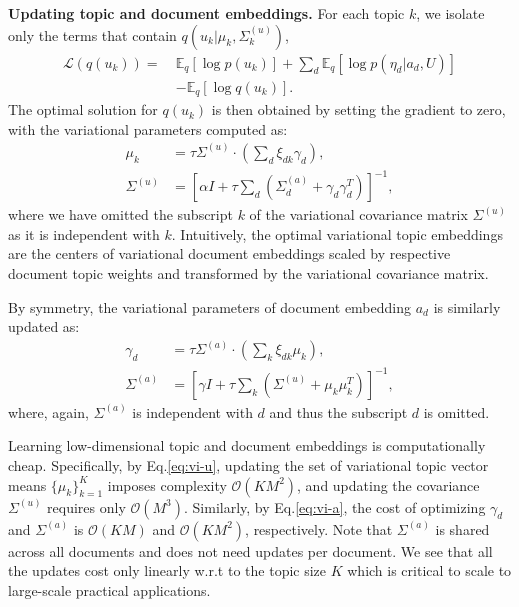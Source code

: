 \documentclass[sigconf]{acmart}
\newcommand{\E}{\mathbb{E}}
\renewcommand*{\bm}[1]{#1}%
\begin{document}
{\bf Updating topic and document embeddings. }
For each topic $k$, we isolate only the terms that contain $q(\bm{u}_k | \bm{\mu}_k, \Sigma^{(u)}_k)$,
\begin{equation}
\begin{split}
\mathcal{L}(q(\bm{u}_k)) =\  &\E_{q}\left[\log p(\bm{u}_k)\right] + \sum\nolimits_{d}\E_{q}\left[\log p(\bm{\eta}_d | \bm{a}_d, \bm{U})\right] \\
&- \E_q \left[ \log q(\bm{u}_k) \right].
\end{split}
\end{equation}
The optimal solution for $q(\bm{u}_k)$ is then obtained by setting the gradient to zero, with the variational parameters computed as: 
\begin{equation}
\begin{split}
\bm{\mu}_k &= \tau\Sigma^{(u)}\cdot\left( \sum\nolimits_{d} \bm{\xi}_{dk}\bm{\gamma}_d \right), \\
\Sigma^{(u)} &= \left[\alpha\bm{I} + \tau \sum\nolimits_{d}\left(\Sigma^{(a)}_d + \bm{\gamma}_d\bm{\gamma}_d^T\right)\right]^{-1},
\end{split}
\label{eq:vi-u}
\end{equation}
where we have omitted the subscript $k$ of the variational covariance matrix $\Sigma^{(u)}$ as it is independent with $k$. Intuitively, the optimal variational topic embeddings are the centers of variational document embeddings scaled by respective document topic weights and transformed by the variational covariance matrix.  

By symmetry, the variational parameters of document embedding $\bm{a}_d$ is similarly updated as:
\begin{equation}
\begin{split}
\bm{\gamma}_d &= \tau\Sigma^{(a)}\cdot\left( \sum\nolimits_{k} \xi_{dk}\bm{\mu}_k \right), \\
\Sigma^{(a)} &= \left[\gamma\bm{I} + \tau \sum\nolimits_{k}\left(\Sigma^{(u)} + \bm{\mu}_k\bm{\mu}_k^T\right)\right]^{-1},
\end{split}
\label{eq:vi-a}
\end{equation}
where, again, $\Sigma^{(a)}$ is independent with $d$ and thus the subscript $d$ is omitted.

Learning low-dimensional topic and document embeddings is computationally cheap. Specifically, by Eq.\eqref{eq:vi-u}, updating the set of variational topic vector means $\{\bm{\mu}_k\}_{k=1}^{K}$ imposes complexity $\mathcal{O}(KM^2)$, and updating the covariance $\Sigma^{(u)}$ requires only $\mathcal{O}(M^3)$. Similarly, by Eq.\eqref{eq:vi-a}, the cost of optimizing $\bm{\gamma}_d$ and $\Sigma^{(a)}$ is $\mathcal{O}(KM)$ and $\mathcal{O}(KM^2)$, respectively. Note that $\Sigma^{(a)}$ is shared across all documents and does not need updates per document. We see that all the updates cost only linearly w.r.t to the topic size $K$ which is critical to scale to large-scale practical applications.
\end{document}
